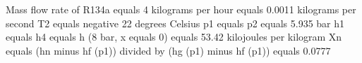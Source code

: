 Mass flow rate of R134a equals 4 kilograms per hour equals 0.0011 kilograms per second  
T2 equals negative 22 degrees Celsius  
p1 equals p2 equals 5.935 bar  
h1 equals h4 equals h (8 bar, x equals 0) equals 53.42 kilojoules per kilogram  
Xn equals (hn minus hf (p1)) divided by (hg (p1) minus hf (p1)) equals 0.0777
